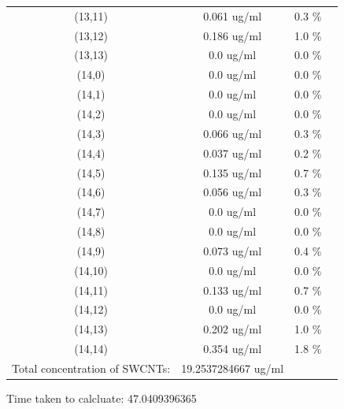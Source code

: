 \documentclass{article}
\begin{document}
\begin{tabular}{c c c c}
(13,11)&        0.061 ug/ml        &0.3 \%\\
(13,12)&        0.186 ug/ml        &1.0 \%\\
(13,13)&        0.0 ug/ml        &0.0 \%\\
(14,0)&        0.0 ug/ml        &0.0 \%\\
(14,1)&        0.0 ug/ml        &0.0 \%\\
(14,2)&        0.0 ug/ml        &0.0 \%\\
(14,3)&        0.066 ug/ml        &0.3 \%\\
(14,4)&        0.037 ug/ml        &0.2 \%\\
(14,5)&        0.135 ug/ml        &0.7 \%\\
(14,6)&        0.056 ug/ml        &0.3 \%\\
(14,7)&        0.0 ug/ml        &0.0 \%\\
(14,8)&        0.0 ug/ml        &0.0 \%\\
(14,9)&        0.073 ug/ml        &0.4 \%\\
(14,10)&        0.0 ug/ml        &0.0 \%\\
(14,11)&        0.133 ug/ml        &0.7 \%\\
(14,12)&        0.0 ug/ml        &0.0 \%\\
(14,13)&        0.202 ug/ml        &1.0 \%\\
(14,14)&        0.354 ug/ml        &1.8 \%\\
Total concentration of SWCNTs: &19.2537284667 ug/ml\\

\end{tabular}Time taken to calcluate: 47.0409396365
\end{document}
